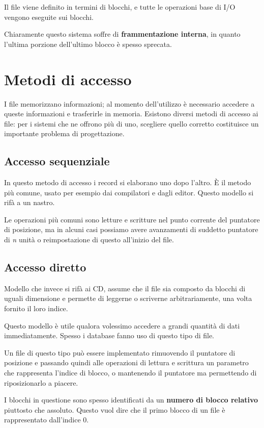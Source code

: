         Il file viene definito in termini di blocchi, e tutte le operazioni base di I/O vengono eseguite sui blocchi.
        
        Chiaramente questo sistema soffre di \textbf{frammentazione interna}, in quanto l'ultima porzione dell'ultimo blocco è spesso sprecata.
        
\section{Metodi di accesso}
    I file memorizzano informazioni; al momento dell'utilizzo è necessario accedere a queste informazioni e trasferirle in memoria. Esistono diversi metodi di accesso ai file: per i sistemi che ne offrono più di uno, scegliere quello corretto costituisce un importante problema di progettazione.
    
    \subsection{Accesso sequenziale}
        In questo metodo di accesso i record si elaborano uno dopo l'altro. È il metodo più comune, usato per esempio dai compilatori e dagli editor. Questo modello si rifà a un nastro.
        
        Le operazioni più comuni sono letture e scritture nel punto corrente del puntatore di posizione, ma in alcuni casi possiamo avere avanzamenti di suddetto puntatore di \textit{n} unità o reimpostazione di questo all'inizio del file.
        
    \subsection{Accesso diretto}
        Modello che invece si rifà ai CD, assume che il file sia composto da blocchi di uguali dimensione e permette di leggerne o scriverne arbitrariamente, una volta fornito il loro indice.
        
        Questo modello è utile qualora volessimo accedere a grandi quantità di dati immediatamente. Spesso i database fanno uso di questo tipo di file.
        
        Un file di questo tipo può essere implementato rimuovendo il puntatore di posizione e passando quindi alle operazioni di lettura e scrittura un parametro che rappresenta l'indice di blocco, o mantenendo il puntatore ma permettendo di riposizionarlo a piacere.
        
        I blocchi in questione sono spesso identificati da un \textbf{numero di blocco relativo} piuttosto che assoluto. Questo vuol dire che il primo blocco di un file è rappresentato dall'indice 0.
        
